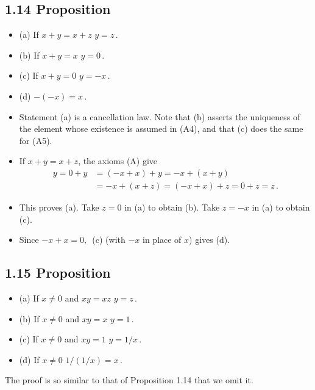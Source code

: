 \subsection*{1.14 Proposition}
\begin{itemize}
\item[] (a) If $x + y = x + z$  $y = z\,.$   
\item[] (b) If $x + y = x$  $y = 0\,.$    
\item[] (c) If $x + y = 0$  $y = -x\,.$    
\item[] (d) $-(-x) = x\,.$
\item[] Statement (a) is a cancellation law. Note that (b) asserts the uniqueness of the element whose existence is assumed in (A4), and that (c) does the same for (A5).

\item[]  If $x + y = x + z$, the axioms (A) give 
\begin{align*}
y = 0 + y &= (- x + x) + y = -x + (x + y) \\
          &= -x + (x + z) = (-x + x) + z = 0 + z = z\,.
\end{align*}

\item[] This proves (a). Take $z = 0$ in (a) to obtain (b). Take $z = -x$ in (a) to obtain (c).
\item[] Since $-x + x =0,\,$ (c) (with $-x$ in place of $x$) gives (d).
\end{itemize}

\subsection*{1.15 Proposition}
\begin{itemize}
\item[] (a) If $x \neq 0$ and $xy = xz$  $ y = z\,.$   
\item[] (b) If $x \neq 0$ and $xy = x$   $ y = 1\,.$   
\item[] (c) If $x \neq 0$ and $xy = 1$   $ y = 1/x\,.$   
\item[] (d) If $x \neq 0$ $1/(1/x) = x\,.$   
\end{itemize}

The proof is so similar to that of Proposition 1.14 that we omit it.  

